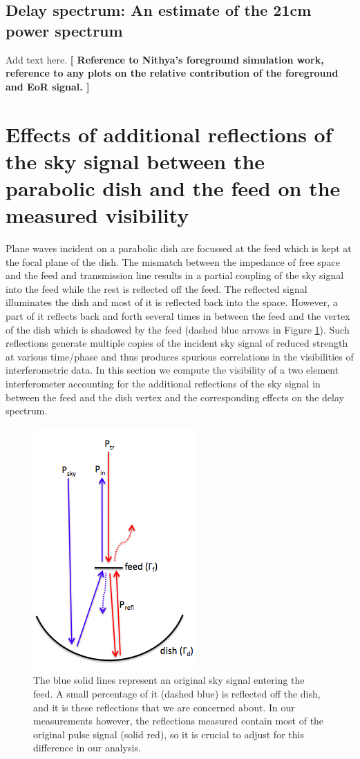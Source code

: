 \documentclass[12pt,preprint]{aastex}
\begin{document}
\subsection{Delay spectrum: An estimate of the 21cm power spectrum}
Add text here. 
 \textbf{[ Reference to Nithya's foreground simulation work, reference to any plots on the relative contribution of the  foreground and EoR signal. ]}


\section{Effects of additional reflections of the sky signal between the parabolic dish and the feed on the measured visibility}
 Plane waves incident on a parabolic dish are focussed at the feed which is kept at the focal plane of the dish. The mismatch between the impedance of free space and the feed and transmission line results in a partial coupling of the sky signal into the feed while the rest is reflected off the feed. The reflected signal illuminates the dish and most of it is reflected back into the space. However, a part of it reflects back and forth several times in between the feed and the vertex of the dish which is shadowed by the feed (dashed blue arrows in Figure \ref{fig:cartoon}). Such reflections generate multiple copies of the incident sky signal of reduced strength at various time/phase and thus produces spurious correlations in the visibilities of interferometric data. In this section we compute the visibility of a two element interferometer accounting for the additional reflections of the sky signal in between the feed and the dish vertex and the corresponding effects on the delay spectrum. 

\begin{figure}[ht!]
\centering
\includegraphics[totalheight=0.35\textheight]{plots/reflection_cartoon.png}
\caption{The blue solid lines represent an original sky signal entering the
feed. A small percentage of it (dashed blue) is reflected off the dish, and it
is these reflections that we are concerned about. In our measurements however,
the reflections measured contain most of the original pulse signal (solid red),
so it is crucial to adjust for this difference in our analysis.}
\label{fig:cartoon}
\end{figure}
\end{document}
